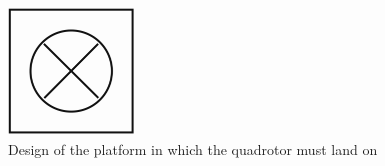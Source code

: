 \begin{figure}[!htbp]
    \centering
    \includegraphics[width=0.3\textwidth]{img/base.pdf}
    \caption{Design of the platform in which the quadrotor must land on}
    \label{fig:finalplatform}
\end{figure}


